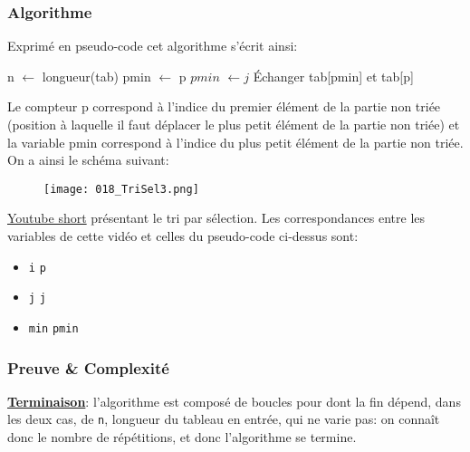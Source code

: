\documentclass[12pt]{article}
\begin{document}
	\subsubsection*{Algorithme}
	\begin{MaReponse}
		Exprimé en pseudo-code cet algorithme s'écrit ainsi:
		
		\begin{algorithmic}[1]
			\State n $\leftarrow$ longueur(tab)
			\State pmin $\leftarrow$ p
			\State $pmin$ $\leftarrow j$
			\EndIf
			\EndFor
			\State Échanger tab[pmin] et tab[p]
			\EndFor
			\State{}
			\EndFunction
		\end{algorithmic}
		
		Le compteur p correspond à l'indice du premier élément de la partie non triée (position à laquelle il faut déplacer le plus petit élément de la partie non triée) et la variable pmin correspond à l’indice du plus petit élément de la partie non triée. On a ainsi le schéma suivant:
		\begin{figure}[H]
			\centering
			\texttt{[image: 018\_TriSel3.png]}
		\end{figure}
	\end{MaReponse}
	
	\begin{MaVid}
		\href{https://www.youtube.com/shorts/HRwi5gwlB0U?feature=share}{Youtube short} présentant le tri par sélection. Les correspondances entre les variables de cette vidéo et celles du pseudo-code ci-dessus sont:
		\begin{itemize}
			\item \texttt{i} \quad \faExchange \quad \texttt{p}
			\item \texttt{j} \quad \faExchange \quad \texttt{j}
			\item \texttt{min} \quad \faExchange \quad \texttt{pmin}
		\end{itemize}
	\end{MaVid}
	
	\subsubsection*{Preuve \& Complexité}
	\textbf{\uline{Terminaison}}: l'algorithme est composé de boucles pour dont la fin dépend, dans les deux cas, de \texttt{n}, longueur du tableau en entrée, qui ne varie pas: on connaît donc le nombre de répétitions, et donc l'algorithme se termine.
	
\end{document}
